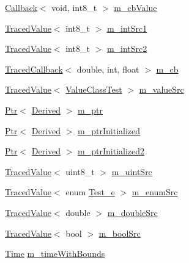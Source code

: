 \begin{DoxyCompactItemize}
\item 
\hyperlink{classns3_1_1Callback}{Callback}$<$ void, int8\+\_\+t $>$ \hyperlink{classAttributeObjectTest_a984d18a9da2f7d239e608007c5b3c634}{m\+\_\+cb\+Value}
\item 
\hyperlink{classns3_1_1TracedValue}{Traced\+Value}$<$ int8\+\_\+t $>$ \hyperlink{classAttributeObjectTest_a93e2dd383ed17746c8899f08fd5105bf}{m\+\_\+int\+Src1}
\item 
\hyperlink{classns3_1_1TracedValue}{Traced\+Value}$<$ int8\+\_\+t $>$ \hyperlink{classAttributeObjectTest_ac1b7e2b4846fbc6d6fdefe30952df285}{m\+\_\+int\+Src2}
\item 
\hyperlink{classns3_1_1TracedCallback}{Traced\+Callback}$<$ double, int, float $>$ \hyperlink{classAttributeObjectTest_a7e039b682502ef9705ad1d6214442b9d}{m\+\_\+cb}
\item 
\hyperlink{classns3_1_1TracedValue}{Traced\+Value}$<$ \hyperlink{classValueClassTest}{Value\+Class\+Test} $>$ \hyperlink{classAttributeObjectTest_ab2ecdc19d4525c8d1ef924dea65042b4}{m\+\_\+value\+Src}
\item 
\hyperlink{classns3_1_1Ptr}{Ptr}$<$ \hyperlink{classDerived}{Derived} $>$ \hyperlink{classAttributeObjectTest_a872972b4d55da842b15ae486e677d4ec}{m\+\_\+ptr}
\item 
\hyperlink{classns3_1_1Ptr}{Ptr}$<$ \hyperlink{classDerived}{Derived} $>$ \hyperlink{classAttributeObjectTest_a9aeef337a9b939b456dd40d3b7af0d40}{m\+\_\+ptr\+Initialized}
\item 
\hyperlink{classns3_1_1Ptr}{Ptr}$<$ \hyperlink{classDerived}{Derived} $>$ \hyperlink{classAttributeObjectTest_aadf2ceb5d7fe5b0117ff2c5dfb54eb66}{m\+\_\+ptr\+Initialized2}
\item 
\hyperlink{classns3_1_1TracedValue}{Traced\+Value}$<$ uint8\+\_\+t $>$ \hyperlink{classAttributeObjectTest_ab4b9231657879777659a0c37395be228}{m\+\_\+uint\+Src}
\item 
\hyperlink{classns3_1_1TracedValue}{Traced\+Value}$<$ enum \hyperlink{classAttributeObjectTest_a7d0dfe3f27ac6d9338a92781caf287cb}{Test\+\_\+e} $>$ \hyperlink{classAttributeObjectTest_ac2735627f880d78ab0f56f5b64f178a8}{m\+\_\+enum\+Src}
\item 
\hyperlink{classns3_1_1TracedValue}{Traced\+Value}$<$ double $>$ \hyperlink{classAttributeObjectTest_a75cec1d44ba434e460411e3442e9bcdb}{m\+\_\+double\+Src}
\item 
\hyperlink{classns3_1_1TracedValue}{Traced\+Value}$<$ bool $>$ \hyperlink{classAttributeObjectTest_abf48b5a24349888503285895c4b3889a}{m\+\_\+bool\+Src}
\item 
\hyperlink{classns3_1_1Time}{Time} \hyperlink{classAttributeObjectTest_add1f27c051f6c07f1f6b915fe7bc987e}{m\+\_\+time\+With\+Bounds}
\end{DoxyCompactItemize}

